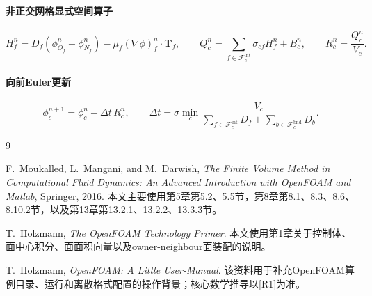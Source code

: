 \documentclass[UTF8,12pt,a4paper]{ctexart}
\numberwithin{equation}{section}
\newcommand{\Rone}{\textnormal{[R1]}}
\newcommand{\Tf}{\bm T}
\begin{document}
\paragraph{非正交网格显式空间算子}
\begin{equation}
  \boxed{
  H_f^n
  =D_f(\phi_{O_f}^n-\phi_{N_f}^n)
  -\mu_f(\nabla\phi)_f^n\cdot\Tf_f,
  \qquad
  Q_c^n
  =\sum_{f\in\mathcal F_c^{\mathrm{int}}}\sigma_{cf}H_f^n+B_c^n,
  \qquad
  R_c^n=\frac{Q_c^n}{V_c}.}
  \label{eq:summary_space}
\end{equation}

\paragraph{向前Euler更新}
\begin{equation}
  \boxed{
  \phi_c^{n+1}
  =\phi_c^n-\Delta t\,R_c^n,
  \qquad
  \Delta t
  =\sigma\min_c
  \frac{V_c}{
  \sum_{f\in\mathcal F_c^{\mathrm{int}}}D_f
  +\sum_{b\in\mathcal F_c^{\mathrm{bnd}}}D_b}}.
  \label{eq:summary_update}
\end{equation}

\newpage
\begin{thebibliography}{9}

F.~Moukalled, L.~Mangani, and M.~Darwish,
\textit{The Finite Volume Method in Computational Fluid Dynamics: An Advanced Introduction with OpenFOAM and Matlab},
Springer, 2016.
本文主要使用第5章第5.2、5.5节，第8章第8.1、8.3、8.6、8.10.2节，以及第13章第13.2.1、13.2.2、13.3.3节。

T.~Holzmann,
\textit{The OpenFOAM Technology Primer}.
本文使用第1章关于控制体、面中心积分、面面积向量以及owner-neighbour面装配的说明。

T.~Holzmann,
\textit{OpenFOAM: A Little User-Manual}.
该资料用于补充OpenFOAM算例目录、运行和离散格式配置的操作背景；核心数学推导以\Rone 为准。

\end{thebibliography}
\end{document}
